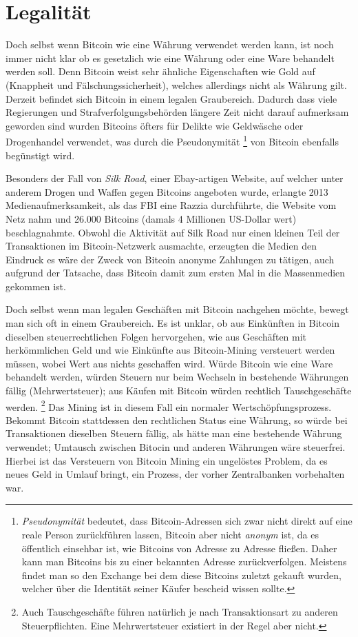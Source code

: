 \section{Legalität}

Doch selbst wenn Bitcoin wie eine Währung verwendet werden kann, ist noch immer nicht klar ob es gesetzlich wie eine Währung oder eine Ware behandelt werden soll.
Denn Bitcoin weist sehr ähnliche Eigenschaften wie Gold auf (Knappheit und Fälschungssicherheit), welches allerdings nicht als Währung gilt.
Derzeit befindet sich Bitcoin in einem legalen Graubereich.
Dadurch dass viele Regierungen und Strafverfolgungsbehörden längere Zeit nicht darauf aufmerksam geworden sind wurden Bitcoins öfters für Delikte wie Geldwäsche  oder Drogenhandel  verwendet, was durch die Pseudonymität%
\footnote{\emph{Pseudonymität} bedeutet, dass Bitcoin-Adressen sich zwar nicht direkt auf eine reale Person zurückführen lassen, Bitcoin aber nicht \emph{anonym} ist, da es öffentlich einsehbar ist, wie Bitcoins von Adresse zu Adresse fließen.
Daher kann man Bitcoins bis zu einer bekannten Adresse zurückverfolgen.
Meistens findet man so den Exchange bei dem diese Bitcoins zuletzt gekauft wurden, welcher über die Identität seiner Käufer bescheid wissen sollte.}
von Bitcoin ebenfalls begünstigt wird.

Besonders der Fall von \emph{Silk Road}, einer Ebay-artigen Website, auf welcher unter anderem Drogen und Waffen gegen Bitcoins angeboten wurde, erlangte 2013 Medienaufmerksamkeit, als das FBI eine Razzia durchführte, die Website vom Netz nahm und 26.000 Bitcoins (damals 4 Millionen US-Dollar wert) beschlagnahmte.
Obwohl die Aktivität auf Silk Road nur einen kleinen Teil der Transaktionen im Bitcoin-Netzwerk ausmachte, erzeugten die Medien den Eindruck es wäre der Zweck von Bitcoin anonyme Zahlungen zu tätigen, auch aufgrund der Tatsache, dass Bitcoin damit zum ersten Mal in die Massenmedien gekommen ist.

Doch selbst wenn man legalen Geschäften mit Bitcoin nachgehen möchte, bewegt man sich oft in einem Graubereich.
Es ist unklar, ob aus Einkünften in Bitcoin dieselben steuerrechtlichen Folgen hervorgehen, wie aus Geschäften mit herkömmlichen Geld und wie Einkünfte aus Bitcoin-Mining versteuert werden müssen, wobei Wert aus nichts geschaffen wird.
Würde Bitcoin wie eine Ware behandelt werden, würden Steuern nur beim Wechseln in bestehende Währungen fällig (Mehrwertsteuer); aus Käufen mit Bitcoin würden rechtlich Tauschgeschäfte werden.%
\footnote{Auch Tauschgeschäfte führen natürlich je nach Transaktionsart zu anderen Steuerpflichten.
Eine Mehrwertsteuer existiert in der Regel aber nicht.}
Das Mining ist in diesem Fall ein normaler Wertschöpfungsprozess.
Bekommt Bitcoin stattdessen den rechtlichen Status eine Währung, so würde bei Transaktionen dieselben Steuern fällig, als hätte man eine bestehende Währung verwendet; Umtausch zwischen Bitocin und anderen Währungen wäre steuerfrei.
Hierbei ist das Versteuern von Bitcoin Mining ein ungelöstes Problem, da es neues Geld in Umlauf bringt, ein Prozess, der vorher Zentralbanken vorbehalten war.
